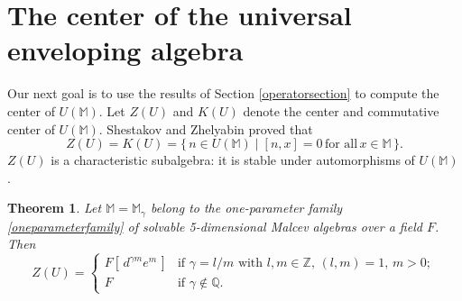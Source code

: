 \documentclass{amsart}
\theoremstyle{plain}
\newtheorem{theorem}[lemma]{Theorem}
\theoremstyle{definition}
\begin{document}
\section{The center of the universal enveloping algebra}

Our next goal is to use the results of Section \ref{operatorsection} to compute
the center of $U({\mathbb M})$.  Let $Z(U)$ and $K(U)$ denote the center and
commutative center of $U(\mathbb{M})$. Shestakov and Zhelyabin
\cite{ShestakovZhelyabin} proved that
  \[
  Z(U) = K(U)
  =
  \{ \,
  n \in U(\mathbb{M})
  \mid
  [n,x] = 0 \, \text{for all} \, x\in \mathbb{M}
  \, \}.
  \]
$Z(U)$ is a characteristic subalgebra: it is stable under automorphisms of
$U(\mathbb{M})$.

\begin{theorem}
Let $\mathbb{M} = \mathbb{M}_\gamma$ belong to the one-parameter family
\eqref{oneparameterfamily} of solvable 5-dimensional Malcev algebras over a
field $F$. Then
  \[
  Z(U)
  =
  \begin{cases}
  F [ \, d^{\gamma m} e^m \, ]
  &\text{if $\gamma = l/m$ with $l, m \in \mathbb{Z}$, $(l,m) = 1$, $m > 0$};
  \\
  F
  &\text{if $\gamma \notin \mathbb{Q}$}.
  \end{cases}
  \]
\end{theorem}
\end{document}
